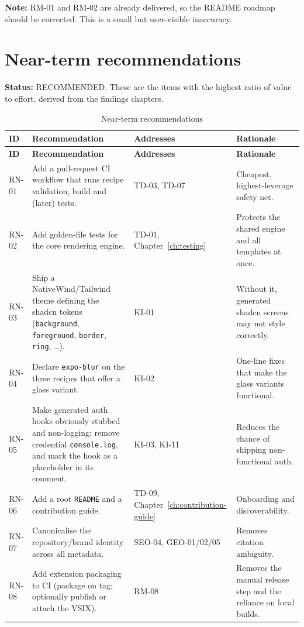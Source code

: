 \textbf{Note:} RM-01 and RM-02 are already delivered, so the README roadmap
should be corrected. This is a small but user-visible inaccuracy.

\section{Near-term recommendations}

\textbf{Status:} RECOMMENDED. These are the items with the highest ratio of
value to effort, derived from the findings chapters.

\begin{longtable}{@{}L{1.4cm}L{5.2cm}L{3cm}L{4.8cm}@{}}
\caption{Near-term recommendations}\\
\toprule
\textbf{ID} & \textbf{Recommendation} & \textbf{Addresses} & \textbf{Rationale} \\
\midrule
\endfirsthead
\toprule
\textbf{ID} & \textbf{Recommendation} & \textbf{Addresses} & \textbf{Rationale} \\
\midrule
\endhead
RN-01 & Add a pull-request CI workflow that runs recipe validation, build and
(later) tests. & TD-03, TD-07 & Cheapest, highest-leverage safety net. \\
RN-02 & Add golden-file tests for the core rendering engine. & TD-01, Chapter~\ref{ch:testing} &
Protects the shared engine and all templates at once. \\
RN-03 & Ship a NativeWind/Tailwind theme defining the shadcn tokens
(\texttt{background}, \texttt{foreground}, \texttt{border}, \texttt{ring},
\dots). & KI-01 & Without it, generated shadcn screens may not style correctly. \\
RN-04 & Declare \texttt{expo-blur} on the three recipes that offer a glass
variant. & KI-02 & One-line fixes that make the glass variants functional. \\
RN-05 & Make generated auth hooks obviously stubbed and non-logging: remove
credential \texttt{console.log}, and mark the hook as a placeholder in its
comment. & KI-03, KI-11 & Reduces the chance of shipping non-functional auth. \\
RN-06 & Add a root \texttt{README} and a contribution guide. & TD-09, Chapter~\ref{ch:contribution-guide} &
Onboarding and discoverability. \\
RN-07 & Canonicalise the repository/brand identity across all metadata. &
SEO-04, GEO-01/02/05 & Removes citation ambiguity. \\
RN-08 & Add extension packaging to CI (package on tag; optionally publish or
attach the VSIX). & RM-08 & Removes the manual release step and the reliance on
local builds. \\
\bottomrule
\end{longtable}

